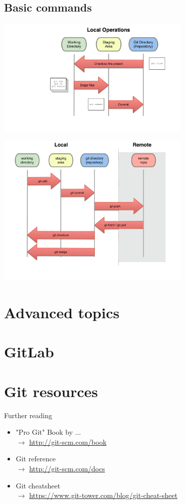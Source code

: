 \documentclass[10pt,xcolor=dvipsnames]{beamer}
\begin{document}
\subsection{Basic commands}

\begin{frame}{}
\includegraphics[width = 0.7\textwidth]{three_states.pdf}
\end{frame}

\begin{frame}{}
\includegraphics[width = 0.7\textwidth]{diagrams-lifecycle_remote.pdf}
\end{frame}

\section{Advanced topics}

\section{GitLab}

\section{Git resources}
\begin{frame}{Further reading}
\begin{itemize}
  \setlength\itemsep{0.4in}
\item "Pro Git" Book by ... \\$\rightarrow$  \url{http://git-scm.com/book}
\item Git reference  \\ $\rightarrow$  \url{http://git-scm.com/docs}
\item Git cheatsheet  \\ $\rightarrow$ \url{https://www.git-tower.com/blog/git-cheat-sheet}
\end{itemize}
\end{frame}
\end{document}
